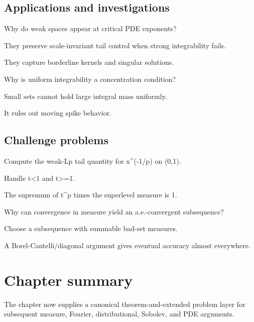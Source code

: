 \subsection*{Applications and investigations}

\begin{exercise}\label{exr:iii08-expand-13}
Why do weak spaces appear at critical PDE exponents?
\end{exercise}
\begin{hint}
They preserve scale-invariant tail control when strong integrability fails.
\end{hint}
\begin{solution}
They capture borderline kernels and singular solutions.
\end{solution}

\begin{exercise}\label{exr:iii08-expand-14}
Why is uniform integrability a concentration condition?
\end{exercise}
\begin{hint}
Small sets cannot hold large integral mass uniformly.
\end{hint}
\begin{solution}
It rules out moving spike behavior.
\end{solution}

\subsection*{Challenge problems}

\begin{exercise}\label{exr:iii08-expand-15}
Compute the weak-Lp tail quantity for x\textasciicircum{}(-1/p) on (0,1).
\end{exercise}
\begin{hint}
Handle t<1 and t>=1.
\end{hint}
\begin{solution}
The supremum of t\textasciicircum{}p times the superlevel measure is 1.
\end{solution}

\begin{exercise}[A.e. subsequence]\label{exr:iii08-expand-16}
Why can convergence in measure yield an a.e.-convergent subsequence?
\end{exercise}
\begin{hint}
Choose a subsequence with summable bad-set measures.
\end{hint}
\begin{solution}
A Borel-Cantelli/diagonal argument gives eventual accuracy almost everywhere.
\end{solution}
\section*{Chapter summary}
The chapter now supplies a canonical theorem-and-extended problem layer for subsequent measure, Fourier, distributional, Sobolev, and PDE arguments.
